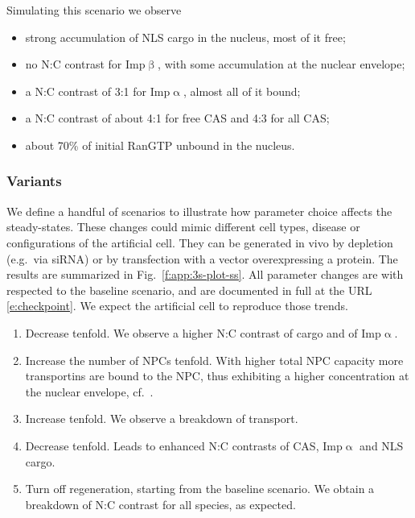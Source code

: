 \documentclass[12pt,notitlepage]{article}
\begin{document}
  
Simulating this scenario
we observe
\begin{itemize}
\item 
	strong accumulation of NLS cargo
	in the nucleus,
	most of it free;
\item
	no N:C contrast for Imp$\upbeta$,
	with some accumulation at the nuclear envelope;
\item
	a N:C contrast of 3:1 for Imp$\upalpha$,
	almost all of it bound;
\item
	a N:C contrast of about 4:1 for free CAS
	and 4:3 for all CAS;
\item
	about 70\% of initial RanGTP
	unbound in the nucleus.
\end{itemize}



%

\subsubsection*{Variants}

We define a handful of scenarios 
to illustrate how 
parameter choice affects 
the steady-states.
%
These changes could mimic
different cell types, disease
or
configurations of the artificial cell.
%
They can be generated in vivo
by depletion (e.g.~via siRNA)
or 
by transfection with a vector overexpressing a protein.
%
%
The results are summarized in Fig.~\ref{f:app:3s-plot-ss}.
%
%
All parameter changes are
with respected 
to the baseline scenario,
and are documented in full at the URL \eqref{e:checkpoint}.
%
%
%
We expect the artificial cell 
to reproduce those trends.



\begin{enumerate}
\item 
	Decrease  tenfold.
	We observe a higher N:C contrast of cargo and of Imp$\upalpha$.
	
\item
	Increase the number of NPCs tenfold.
	With higher total NPC capacity
	more transportins are bound to the NPC,
	thus exhibiting a higher concentration
	at the nuclear envelope, cf.~\cite{KalitaETAL2022}.
	
\item
	Increase  tenfold.
	We observe a breakdown of transport.

\item
	Decrease  tenfold.
	Leads to enhanced N:C contrasts
	of CAS, Imp$\upalpha$ and NLS cargo.
	
\item
	Turn off  regeneration,
	starting from the baseline scenario.
	We obtain a breakdown of N:C contrast
	for all species,
	as expected.
\end{enumerate}
\end{document}
